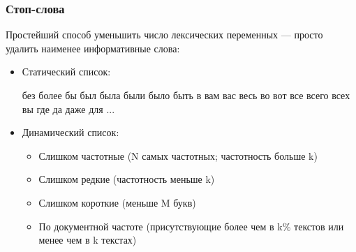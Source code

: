 \documentclass[svgnames]{beamer}
\begin{document}
\begin{frame}
  \frametitle{Стоп-слова} Простейший способ уменьшить число
  лексических переменных — просто удалить \alert{наименее информативные} слова:

  \begin{itemize}
  \item Статический список:

без
более
бы
был
была
были
было
быть
в
вам
вас
весь
во
вот
все
всего
всех
вы
где
да
даже
для ...

  \item Динамический список:

    \begin{itemize}
    \item Слишком частотные (N самых частотных; частотность больше k)
    \item Слишком редкие (частотность меньше k)
    \item Слишком короткие (меньше M букв)
    \item По документной частоте (присутствующие более чем в k\%
      текстов или менее чем в k текстах)
    \end{itemize}
  \end{itemize}
\end{frame}
\end{document}
